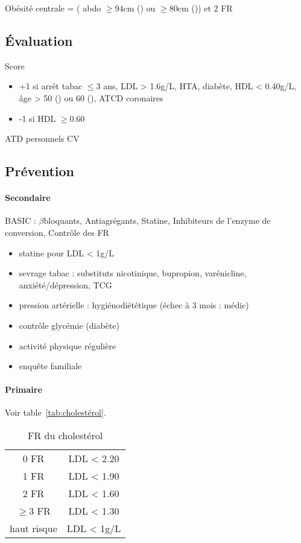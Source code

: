 Obésité centrale = (\diameter{} abdo $\ge 94 $cm (\male) ou $\ge 80$cm (\female))
et 2 FR


\subsection{Évaluation}
\label{subsec:fr}
Score
\begin{itemize}
  \item +1 si {arrêt tabac $\le 3$ ans, LDL > 1.6g/L, HTA, diabète, HDL < 0.40g/L, âge > 50
(\male) ou 60 (\female), ATCD coronaires}
  \item  -1 si HDL $\ge 0.60$
\end{itemize}

ATD personnels CV

\subsection{Prévention}
\paragraph{Secondaire}
\label{subsec:basic_prev}        
BASIC : $\beta$bloquants, Antiagrégants, Statine, Inhibiteurs de l'enzyme de
conversion, Contrôle des FR

\begin{itemize}
  \item statine pour LDL < 1g/L
\item sevrage tabac : substituts nicotinique, {bupropion, varénicline},
  anxiété/dépression, TCG
  \item pression artérielle : hygiénodiététique (échec à 3 mois : médic)
  \item contrôle glycémie (diabète)
  \item activité physique régulière
  \item enquête familiale
\end{itemize}

\paragraph{Primaire}
Voir table~\ref{tab:cholestérol}.

\begin{table}
  \centering
  \begin{tabular}{cc}
    0 FR & LDL < 2.20 \\
    1 FR & LDL < 1.90\\
    2 FR & LDL < 1.60\\
    $\ge 3$ FR& LDL < 1.30 \\
    haut risque & LDL < 1g/L
  \end{tabular}
  \caption{FR du cholestérol}
  \label{tab:cholesterol}
\end{table}
